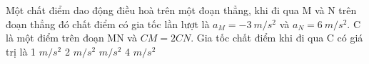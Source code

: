 \begin{vidu}%
Một chất điểm dao động điều hoà trên một đoạn thẳng, khi đi qua M và N trên đoạn thẳng đó chất điểm có gia tốc lần lượt là $a_M = - 3\ m/s^2$ và $a_N = 6\ m/s^2$. C là một điểm trên đoạn MN và $CM = 2CN$. Gia tốc chất điểm khi đi qua C có giá trị là
\choice
{1 $m/s^2$}
{2 $m/s^2$}
{ $m/s^2$}
{4 $m/s^2$}
\end{vidu} %
 %
